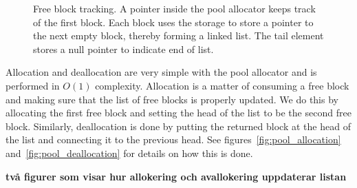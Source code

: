 \documentclass{article}
\begin{document}
\begin{figure}[h]
    \centering
    \caption{Free block tracking. A pointer inside the pool allocator keeps track of the first block. Each block uses the storage to store a pointer to the next empty block, thereby forming a linked list. The tail element stores a null pointer to indicate end of list.}
    \label{fig:pool_free_blocks}
\end{figure}

Allocation and deallocation are very simple with the pool allocator and is performed in $O(1)$ complexity. Allocation is a matter of consuming a free block and making sure that the list of free blocks is properly updated. We do this by allocating the first free block and setting the head of the list to be the second free block. Similarly, deallocation is done by putting the returned block at the head of the list and connecting it to the previous head. See figures~\ref{fig:pool_allocation} and~\ref{fig:pool_deallocation} for details on how this is done.

\textbf{två figurer som visar hur allokering och avallokering uppdaterar listan}
\end{document}
